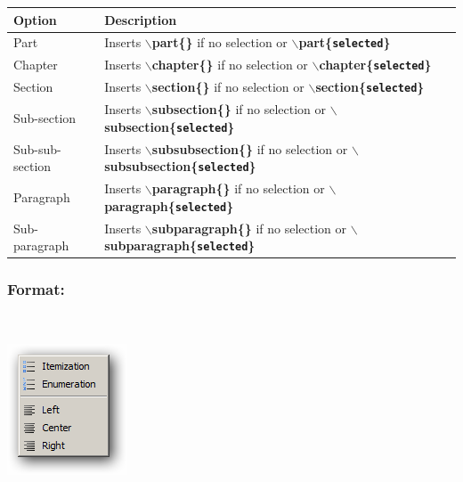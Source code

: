 \begin{scriptsize}\begin{tabularx}{\textwidth}{>{\hsize=0.2\hsize}X>{\hsize=0.8\hsize}X}\\
    \hline
    \textbf{Option} & \textbf{Description} \\
    \hline
    Part & Inserts \textbf{$\backslash$part\{\}} if no selection or \textbf{$\backslash$part\{\texttt{selected}\}} \\
    Chapter & Inserts \textbf{$\backslash$chapter\{\}} if no selection or \textbf{$\backslash$chapter\{\texttt{selected}\}} \\
    Section & Inserts \textbf{$\backslash$section\{\}} if no selection or \textbf{$\backslash$section\{\texttt{selected}\}} \\
    Sub-section & Inserts \textbf{$\backslash$subsection\{\}} if no selection or \textbf{$\backslash$subsection\{\texttt{selected}\}} \\
    Sub-sub-section & Inserts \textbf{$\backslash$subsubsection\{\}} if no selection or \textbf{$\backslash$subsubsection\{\texttt{selected}\}} \\
    Paragraph & Inserts \textbf{$\backslash$paragraph\{\}} if no selection or \textbf{$\backslash$paragraph\{\texttt{selected}\}} \\
    Sub-paragraph & Inserts \textbf{$\backslash$subparagraph\{\}} if no selection or \textbf{$\backslash$subparagraph\{\texttt{selected}\}} \\
    \hline
  \end{tabularx}\end{scriptsize}


\hypertarget{menu_insert_latex_format}{}
\subsubsection{Format:}\\

\includegraphics[scale=0.50]{./res/menu_insert_latex_format.png}\\

